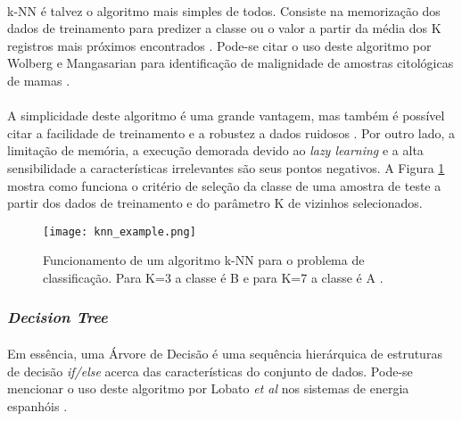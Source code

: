 \paragraph{} k-NN é talvez o algoritmo mais simples de todos. Consiste na memorização dos dados de treinamento para predizer a classe ou o valor a partir da média dos K registros mais próximos encontrados \cite{muller2016introduction, peterson2009k}. Pode-se citar o uso deste algoritmo por Wolberg e Mangasarian para identificação de malignidade de amostras citológicas de mamas \cite{wolberg1990multisurface}.

\paragraph{} A simplicidade deste algoritmo é uma grande vantagem, mas também é possível citar a facilidade de treinamento e a robustez a dados ruidosos \cite{bhatia2010survey}. Por outro lado, a limitação de memória, a execução demorada devido ao \textit{lazy learning} \cite{aha2013lazy} e a alta sensibilidade a características irrelevantes são seus pontos negativos. A Figura \ref{fig:8} mostra como funciona o critério de seleção da classe de uma amostra de teste a partir dos dados de treinamento e do parâmetro K de vizinhos selecionados.

\begin{figure}[!htb]
    \texttt{[image: knn\_example.png]}
    \centering
    \caption{Funcionamento de um algoritmo k-NN para o problema de classificação. Para K=3 a classe é B e para K=7 a classe é A \cite{knn_classification}.}
    \label{fig:8}
\end{figure}


\FloatBarrier
\subsubsection*{\textit{Decision Tree}}

\paragraph{} Em essência, uma Árvore de Decisão é uma sequência hierárquica de estruturas de decisão \textit{if/else} acerca das características do conjunto de dados. Pode-se mencionar o uso deste algoritmo por Lobato \textit{et al} nos sistemas de energia espanhóis \cite{lobato2006decision}.

